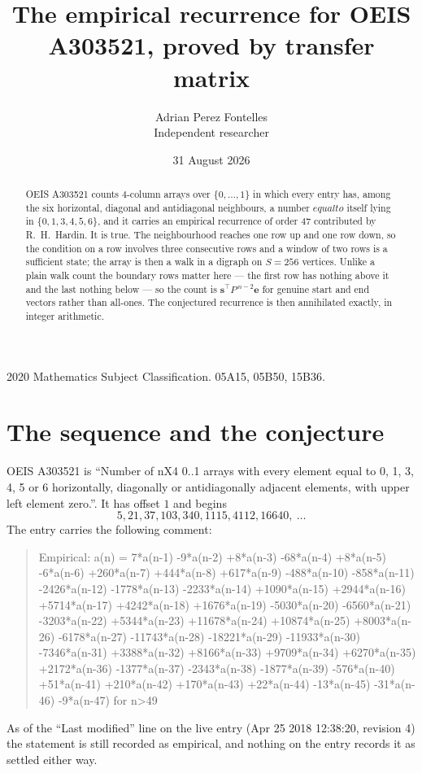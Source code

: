 \documentclass[11pt,a4paper]{article}
\title{The empirical recurrence for OEIS A303521, proved by transfer matrix}
\author{Adrian Perez Fontelles\\ \small Independent researcher}
\date{31 August 2026}
\theoremstyle{plain}
\theoremstyle{definition}
\begin{document}
\maketitle

\begin{abstract}
OEIS A303521 counts $4$-column arrays over $\{0,\dots,1\}$ in which every entry has,
among the six horizontal, diagonal and antidiagonal neighbours, a number $equal to$ itself lying in $\{0,1,3,4,5,6\}$, and it carries an empirical
recurrence of order $47$ contributed by R.~H.~Hardin. It is true. The neighbourhood
reaches one row up and one row down, so the condition on a row involves three consecutive
rows and a window of two rows is a sufficient state; the array is then a walk in a digraph
on $S=256$ vertices. Unlike a plain walk count the boundary rows matter here --- the first
row has nothing above it and the last nothing below --- so the count is
$\mathbf{s}^{\!\top}P^{\,n-2}\mathbf{e}$ for genuine start and end vectors rather than
all-ones. The conjectured recurrence is then annihilated exactly, in integer arithmetic.
\end{abstract}

\noindent\small 2020 Mathematics Subject Classification. 05A15, 05B50, 15B36.\normalsize

\section{The sequence and the conjecture}

OEIS A303521 is ``Number of nX4 0..1 arrays with every element equal to 0, 1, 3, 4, 5 or 6 horizontally, diagonally or antidiagonally adjacent elements, with upper left element zero.''. It has offset
$1$ and begins
\[
5, 21, 37, 103, 340, 1115, 4112, 16640,\ \dots
\]
The entry carries the following comment:
\begin{quote}\small
Empirical: a(n) = 7*a(n-1) -9*a(n-2) +8*a(n-3) -68*a(n-4) +8*a(n-5) -6*a(n-6) +260*a(n-7) +444*a(n-8) +617*a(n-9) -488*a(n-10) -858*a(n-11) -2426*a(n-12) -1778*a(n-13) -2233*a(n-14) +1090*a(n-15) +2944*a(n-16) +5714*a(n-17) +4242*a(n-18) +1676*a(n-19) -5030*a(n-20) -6560*a(n-21) -3203*a(n-22) +5344*a(n-23) +11678*a(n-24) +10874*a(n-25) +8003*a(n-26) -6178*a(n-27) -11743*a(n-28) -18221*a(n-29) -11933*a(n-30) -7346*a(n-31) +3388*a(n-32) +8166*a(n-33) +9709*a(n-34) +6270*a(n-35) +2172*a(n-36) -1377*a(n-37) -2343*a(n-38) -1877*a(n-39) -576*a(n-40) +51*a(n-41) +210*a(n-42) +170*a(n-43) +22*a(n-44) -13*a(n-45) -31*a(n-46) -9*a(n-47) for n>49
\end{quote}
As of the ``Last modified'' line on the live entry (Apr 25 2018 12:38:20, revision
4) the statement is still recorded as empirical, and nothing on the entry
records it as settled either way.
\end{document}
